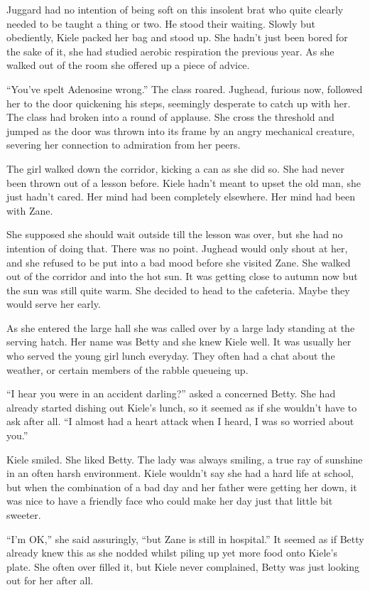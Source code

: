 Juggard had no intention of being soft on this insolent brat who quite clearly needed to be taught a thing or two.  He stood their waiting.  Slowly but obediently, Kiele packed her bag and stood up.  She hadn't just been bored for the sake of it, she had studied aerobic respiration the previous year.  As she walked out of the room she offered up a piece of advice.

``You've spelt Adenosine wrong.''  The class roared.  Jughead, furious now, followed her to the door quickening his steps, seemingly desperate to catch up with her.  The class had broken into a round of applause.  She cross the threshold and jumped as the door was thrown into its frame by an angry mechanical creature, severing her connection to admiration from her peers.

The girl walked down the corridor, kicking a can as she did so.  She had never been thrown out of a lesson before.  Kiele hadn't meant to upset the old man, she just hadn't cared.  Her mind had been completely elsewhere.  Her mind had been with Zane.  

She supposed she should wait outside till the lesson was over, but she had no intention of doing that.  There was no point.  Jughead would only shout at her, and she refused to be put into a bad mood before she visited Zane.  She walked out of the corridor and into the hot sun.  It was getting close to autumn now but the sun was still quite warm.  She decided to head to the cafeteria.  Maybe they would serve her early.

As she entered the large hall she was called over by a large lady standing at the serving hatch.  Her name was Betty and she knew Kiele well.  It was usually her who served the young girl lunch everyday.  They often had a chat about the weather, or certain members of the rabble queueing up.  

``I hear you were in an accident darling?'' asked a concerned Betty.  She had already started dishing out Kiele's lunch, so it seemed as if she wouldn't have to ask after all.  ``I almost had a heart attack when I heard, I was so worried about you.''

Kiele smiled.  She liked Betty.  The lady was always smiling, a true ray of sunshine in an often harsh environment.  Kiele wouldn't say she had a hard life at school, but when the combination of a bad day and her father were getting her down, it was nice to have a friendly face who could make her day just that little bit sweeter.  

``I'm OK,'' she said assuringly, ``but Zane is still in hospital.''  It seemed as if Betty already knew this as she nodded whilst piling up yet more food onto Kiele's plate.  She often over filled it, but Kiele never complained, Betty was just looking out for her after all.

